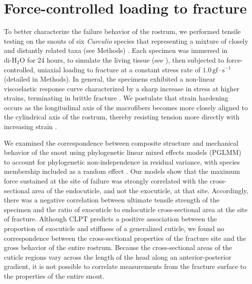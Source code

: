 \documentclass[twocolumn, linenumbers, superscriptaddress, nofootinbib]{revtex4-1}
\begin{document}
	\section{Force-controlled loading to fracture}
		To better characterize the failure behavior of the rostrum, we performed tensile testing on the snouts of six \textit{Curculio} species that representing a mixture of closely and distantly related taxa (see Methods) \cite{Hughes2004phylo, Hughes2004eco, Bonal2016, Bonal2011}.
		Each specimen was immersed in $\text{di-H}_2\text{O}$ for 24 hours, to simulate the living tissue (see \cite{Klocke2011}), then subjected to force-controlled, uniaxial loading to fracture at a constant stress rate of $1.0\,\text{gf}\cdot\text{s}^{-1}$ (detailed in Methods).
		In general, the specimens exhibited a non-linear viscoelastic response curve characterized by a sharp increase in stress at higher strains, terminating in brittle fracture \cite{Mihai2017}.
		We postulate that strain hardening occurs as the longitudinal axis of the macrofibers becomes more closely aligned to the cylindrical axis of the rostrum, thereby resisting tension more directly with increasing strain \cite{Munster2013}.
		
		We examined the correspondence between composite structure and mechanical behavior of the snout using phylogenetic linear mixed effects models (PGLMM) to account for phylogenetic non-independence in residual variance, with species membership included as a random effect \cite{Revell2010, Felsenstein1985}.
		Our models show that the maximum force sustained at the site of failure was strongly correlated with the cross-sectional area of the endocuticle, and not the exocuticle, at that site.
		Accordingly, there was a negative correlation between ultimate tensile strength of the specimen and the ratio of exocuticle to endocuticle cross-sectional area at the site of fracture.
		Although CLPT predicts a positive association between the proportion of exocuticle and stiffness of a generalized cuticle, we found no correspondence between the cross-sectional properties of the fracture site and the gross behavior of the entire rostrum.
		Because the cross-sectional areas of the cuticle regions vary across the length of the head along an anterior-posterior gradient, it is not possible to correlate measurements from the fracture surface to the properties of the entire snout.
		
\end{document}
